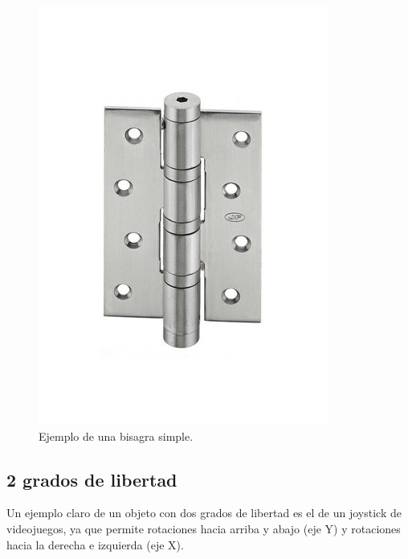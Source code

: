 \documentclass{article}
\begin{document}
\begin{figure}[H]
   \centering
   \includegraphics[width=\textwidth]{imagenes/bisagra.jpeg}
   \caption{Ejemplo de una bisagra simple\cite{bisagra}.}
\end{figure}

\subsection{2 grados de libertad}

Un ejemplo claro de un objeto con dos grados de libertad es el de un joystick de videojuegos, ya que permite rotaciones hacia arriba y abajo (eje Y) y rotaciones hacia la derecha e izquierda (eje X).
\end{document}
